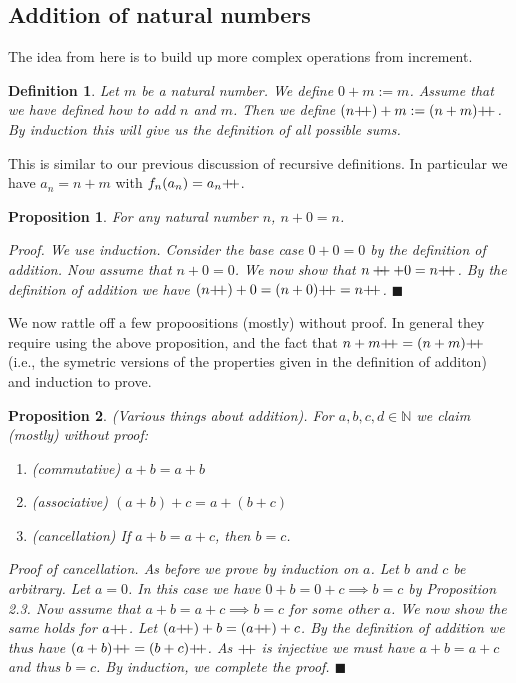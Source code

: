 \documentclass{article}
\newtheorem{definition}{Definition}[subsection]
\newtheorem{proposition}{Proposition}[subsection]
\newcommand{\N}{\mathbb{N}}
\newcommand{\pp}{\mathbin{+\mkern-5mu+}}
\begin{document}
\subsection{Addition of natural numbers}

The idea from here is to build up more complex operations from increment.

\begin{definition}
	Let $m$ be a natural number. We define $0 + m := m$. Assume 
	that we have defined how to add $n$ and $m$. Then we 
	define $(n\pp) + m := (n + m)\pp$. By induction this will give 
	us the definition of all possible sums.
\end{definition}

This is similar to our previous discussion of recursive definitions.
In particular we have $a_n = n + m$ with $f_n(a_n) = a_n\pp$.

\begin{proposition}
	For any natural number $n$, $n + 0 = n$. 

	Proof. We use induction. Consider the base case $0 + 0 = 0$ by 
	the definition of addition. Now assume that $n + 0 = 0$. We now 
	show that $n\pp + 0 = n\pp$. By the definition of addition we have 
	$(n\pp) + 0 = (n + 0)\pp = n\pp$. \hfill $\blacksquare$
\end{proposition}


We now rattle off a few propoositions (mostly) without proof. In general they 
require using the above proposition, and the fact that 
$n + m\pp = (n + m)\pp$ (i.e., the symetric versions of the
properties given in the definition of additon) and induction
to prove.

\begin{proposition}
	(Various things about addition). For $a,b,c,d \in \N$ we claim
	(mostly) without proof:

	\begin{enumerate}
		\item  (commutative) $a + b = a +b$
		\item (associative) $(a + b) + c = a + (b + c)$
		\item (cancellation)  If $a + b = a + c$, then $b = c$.
	\end{enumerate}

	Proof of cancellation. As before we prove by induction on $a$. 
	Let $b$ and $c$ be arbitrary. Let $a = 0$. In this 
	case we have $0 + b = 0 + c \implies b =c $ by Proposition 
	2.3. Now assume that $a + b = a + c \implies b = c$ for 
	some other $a$. We now show the same holds for $a\pp$. 
	Let $(a\pp) + b = (a\pp) + c$. By the definition of addition
	we thus have $(a + b)\pp = (b +c)\pp$. As $\pp$ is injective 
	we must have $a + b = a + c$ and thus $b = c$. By induction,
	we complete the proof.
	\hfill $\blacksquare$
\end{proposition}
\end{document}
